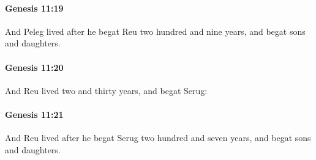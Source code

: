 		\paragraph{Genesis 11:19} %
			\label{GENESIS-11-19}

			And Peleg lived after he begat Reu two hundred and nine years, and begat sons and daughters.


		\paragraph{Genesis 11:20} %
			\label{GENESIS-11-20}

			And Reu lived two and thirty years, and begat Serug:


		\paragraph{Genesis 11:21} %
			\label{GENESIS-11-21}

			And Reu lived after he begat Serug two hundred and seven years, and begat sons and daughters.


